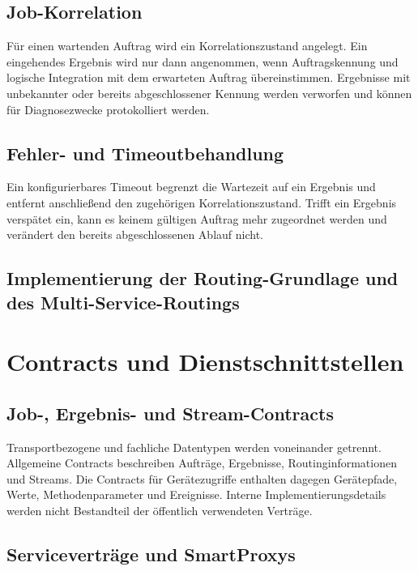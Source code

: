 \subsection{Job-Korrelation}

Für einen wartenden Auftrag wird ein Korrelationszustand angelegt. Ein eingehendes Ergebnis wird nur dann angenommen, wenn Auftragskennung und logische Integration mit dem erwarteten Auftrag übereinstimmen. Ergebnisse mit unbekannter oder bereits abgeschlossener Kennung werden verworfen und können für Diagnosezwecke protokolliert werden.

\subsection{Fehler- und Timeoutbehandlung}

Ein konfigurierbares Timeout begrenzt die Wartezeit auf ein Ergebnis und entfernt anschließend den zugehörigen Korrelationszustand. Trifft ein Ergebnis verspätet ein, kann es keinem gültigen Auftrag mehr zugeordnet werden und verändert den bereits abgeschlossenen Ablauf nicht.

\subsection{Implementierung der Routing-Grundlage und des Multi-Service-Routings}

\section{Contracts und Dienstschnittstellen}

\subsection{Job-, Ergebnis- und Stream-Contracts}

Transportbezogene und fachliche Datentypen werden voneinander getrennt. Allgemeine Contracts beschreiben Aufträge, Ergebnisse, Routinginformationen und Streams. Die Contracts für Gerätezugriffe enthalten dagegen Gerätepfade, Werte, Methodenparameter und Ereignisse. Interne Implementierungsdetails werden nicht Bestandteil der öffentlich verwendeten Verträge.

\subsection{Serviceverträge und SmartProxys}

